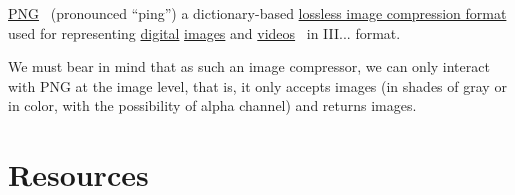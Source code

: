 \href{https://en.wikipedia.org/wiki/Portable_Network_Graphics}{PNG}~\cite{vruiz__PNG}
(pronounced ``ping'') a dictionary-based
\href{https://en.wikipedia.org/wiki/Lossless_compression}{lossless
  image compression format} used for representing
\href{https://en.wikipedia.org/wiki/Digital_data}{digital}
\href{https://en.wikipedia.org/wiki/Digital_image}{images} and
\href{https://en.wikipedia.org/wiki/Video}{videos}~\cite{vruiz__image_video}
in III... format.

We must bear in mind that as such an image compressor, we can only
interact with PNG at the image level, that is, it only accepts images
(in shades of gray or in color, with the possibility of alpha channel)
and returns images.


\section{Resources}

\renewcommand{\addcontentsline}[3]{}%

